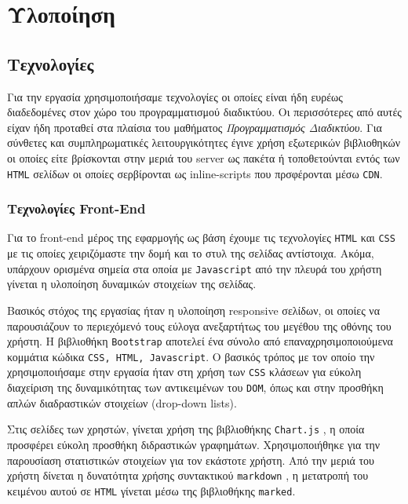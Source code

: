 \documentclass[acmtog, nonacm, language=english, language=greek]{acmart}
\newcommand{\en}[1]{\textlatin{#1}}
\newcommand{\src}[1]{\texttt{\en{#1}}}
\begin{document}
\section{Υλοποίηση}

\subsection{Τεχνολογίες}

Για την εργασία χρησιμοποιήσαμε τεχνολογίες οι οποίες 
είναι ήδη ευρέως διαδεδομένες στον χώρο του προγραμματισμού 
διαδικτύου. Οι περισσότερες από αυτές είχαν ήδη προταθεί 
στα πλαίσια του μαθήματος \textit{Προγραμματισμός Διαδικτύου}.
Για σύνθετες και συμπληρωματικές λειτουργικότητες έγινε 
χρήση εξωτερικών βιβλιοθηκών οι οποίες 
είτε βρίσκονται στην μεριά του \en{server} ως 
πακέτα ή τοποθετούνται εντός των \src{HTML} σελίδων 
οι οποίες σερβίρονται ως \en{inline-scripts} που πρσφέρονται 
μέσω \src{CDN}. \cite{CDN}

\subsubsection{Τεχνολογίες \en{Front-End}}

Για το \en{front-end} μέρος της εφαρμογής ως βάση έχουμε τις τεχνολογίες
\src{HTML} και \src{CSS} με τις οποίες χειριζόμαστε την δομή και το στυλ της
σελίδας αντίστοιχα. Ακόμα, υπάρχουν ορισμένα σημεία στα οποία με
\src{Javascript} από την πλευρά του χρήστη γίνεται η υλοποίηση δυναμικών
στοιχείων της σελίδας. 

Βασικός στόχος της εργασίας ήταν η υλοποίηση \en{responsive} σελίδων, οι οποίες
να παρουσιάζουν το περιεχόμενό τους εύλογα ανεξαρτήτως του μεγέθου της οθόνης
του χρήστη. Η βιβλιοθήκη \src{Bootstrap} \cite{Bootstrap} αποτελεί ένα σύνολο
από επαναχρησιμοποιούμενα κομμάτια κώδικα \src{CSS, HTML, Javascript}. Ο
βασικός τρόπος με τον οποίο την χρησιμοποιήσαμε στην εργασία ήταν στη χρήση των
\src{CSS} κλάσεων για εύκολη διαχείριση της δυναμικότητας των αντικειμένων του
\src{DOM}, όπως και στην προσθήκη απλών διαδραστικών στοιχείων \en{(drop-down
lists)}.

Στις σελίδες των χρηστών, γίνεται χρήση της βιβλιοθήκης \src{Chart.js}
\cite{ChartJS}, η οποία προσφέρει εύκολη προσθήκη διδραστικών γραφημάτων.
Χρησιμοποιήθηκε για την παρουσίαση στατιστικών στοιχείων για τον εκάστοτε
χρήστη. Από την μεριά του χρήστη δίνεται η δυνατότητα χρήσης συντακτικού
\src{markdown} \cite{Markdown}, η μετατροπή του κειμένου αυτού σε \src{HTML}
γίνεται μέσω της βιβλιοθήκης \src{marked}. \cite{Marked}
\end{document}
